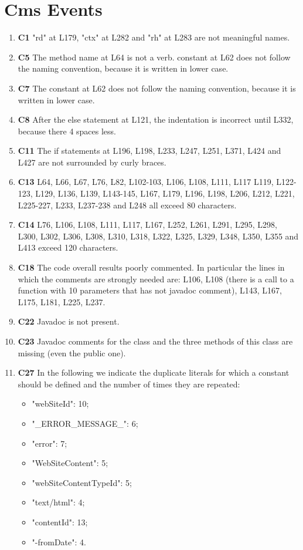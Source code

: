 \section{Cms Events}

\begin{enumerate}
\item \textbf{C1} "rd" at L179, "ctx" at L282 and "rh" at L283 are not meaningful names.
\item \textbf{C5} The method name at L64 is not a verb. constant at L62 does not follow the naming convention, because it is written in lower case.
\item \textbf{C7} The constant at L62 does not follow the naming convention, because it is written in lower case.
\item \textbf{C8} After the else statement at L121, the indentation is incorrect until L332, because there 4 spaces less.
\item \textbf{C11} The if statements at L196, L198, L233, L247, L251, L371, L424 and L427 are not surrounded by curly braces.
\item \textbf{C13} L64, L66, L67, L76, L82, L102-103, L106, L108, L111, L117 L119, L122-123, L129, L136, L139, L143-145, L167, L179, L196, L198, L206, L212, L221, L225-227, L233, L237-238 and L248 all exceed 80 characters.
\item \textbf{C14} L76, L106, L108, L111, L117, L167, L252, L261, L291, L295, L298, L300, L302, L306, L308, L310, L318, L322, L325, L329, L348, L350, L355 and L413 exceed 120 characters.
\item \textbf{C18} The code overall results poorly commented. In particular the lines in which the comments are strongly needed are: L106, L108 (there is a call to a function with 10 parameters that has not javadoc comment), L143, L167, L175, L181, L225, L237.
\item \textbf{C22} Javadoc is not present.
\item \textbf{C23} Javadoc comments for the class and the three methods of this class are missing (even the public one).
\item \textbf{C27} In the following we indicate the duplicate literals for which a constant should be defined and the number of times they are repeated:
	\begin{itemize}
	\item "webSiteId": 10;
	\item "\_ERROR\_MESSAGE\_": 6;
	\item "error": 7;
	\item "WebSiteContent": 5;
	\item "webSiteContentTypeId": 5;
	\item "text/html": 4;
	\item "contentId": 13;
	\item "-fromDate": 4.
	\end{itemize}
	

\end{enumerate}
